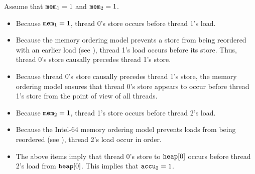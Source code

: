 \begin{table}[!hbt]
\noindent{}
\caption[Stores Are Transitively Visible]{Stores Are Transitively Visible \cite[Example 8-6]{ref:Intel}}
\label{tbl:litmus:intel:6}
\end{table}

\noindent
Assume that $\texttt{mem}_1 = 1$ and $\texttt{mem}_2 = 1$.
\begin{itemize}
  \item Because $\texttt{mem}_1 = 1$, thread 0’s store occurs before thread 1’s load.
  \item Because the memory ordering model prevents a store from being reordered with an earlier load (see \cite[Section 8.2.3.3]{ref:Intel}), thread 1’s load occurs before its store. Thus, thread 0’s store causally precedes thread 1’s store.
  \item Because thread 0’s store causally precedes thread 1’s store, the memory ordering model ensures that thread 0’s store appears to occur before thread 1’s store from the point of view of all threads.
  \item Because $\texttt{mem}_2 = 1$, thread 1’s store occurs before thread 2’s load.
  \item Because the Intel-64 memory ordering model prevents loads from being reordered (see \cite[Section 8.2.3.2]{ref:Intel}), thread 2’s load occur in order.
  \item The above items imply that thread 0’s store to $\texttt{heap}[0]$ occurs before thread 2’s load from $\texttt{heap}[0]$. This implies that $\texttt{accu}_2 = 1$.
\end{itemize}

